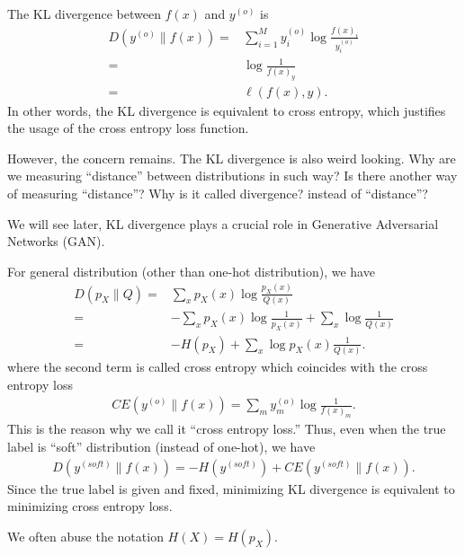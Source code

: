 \documentclass{article}
\begin{document}
The KL divergence between $f(x)$ and $y^{(o)}$ is
\begin{align}
    D(y^{(o)}\| f(x)) 
    =&  \sum_{i=1}^M y^{(o)}_i \log \frac{f(x)_i}{y^{(o)}_i}\\
    =& \log \frac{1}{f(x)_y}\\ 
    =& \ell(f(x),y).
\end{align}
In other words, the KL divergence is equivalent to cross entropy,
which justifies the usage of the cross entropy loss function.

However, the concern remains.
The KL divergence is also weird looking.
Why are we measuring ``distance'' between distributions in such way?
Is there another way of measuring ``distance''?
Why is it called divergence? instead of ``distance''?

\begin{remark}
    We will see later, KL divergence plays a crucial role in Generative Adversarial Networks (GAN).
\end{remark}



For general distribution (other than one-hot distribution), we have
\begin{align}
    D(p_X\|Q) =& \sum_{x} p_X(x) \log \frac{p_X(x)}{Q(x)}\\
    =& -\sum_{x} p_X(x) \log \frac{1}{p_X(x)} + \sum_x \log\frac{1}{Q(x)}\\
    =& -H(p_X) +\sum_x \log p_X(x)\frac{1}{Q(x)}.
\end{align}
where the second term is called cross entropy which coincides with the cross entropy loss
\begin{align}
    CE(y^{(o)}\|f(x)) = \sum_m y^{(o)}_m \log \frac{1}{f(x)_m}.
\end{align}
This is the reason why we call it ``cross entropy loss.''
Thus, even when the true label is ``soft'' distribution (instead of one-hot), we have
\begin{align}
    D(y^{(soft)} \| f(x)) = -H( y^{(soft)}) + CE(y^{(soft)} \| f(x)).
\end{align}
Since the true label is given and fixed, minimizing KL divergence is equivalent to minimizing cross entropy loss.


\begin{remark}
    We often abuse the notation $H(X) = H(p_X)$.
\end{remark}

\end{document}
